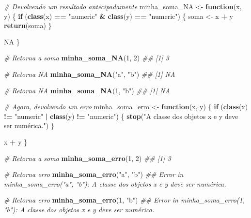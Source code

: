 \documentclass[]{book}
\newenvironment{Shaded}{\begin{snugshade}}{\end{snugshade}}
\newcommand{\CommentTok}[1]{\textcolor[rgb]{0.56,0.35,0.01}{\textit{#1}}}
\newcommand{\ControlFlowTok}[1]{\textcolor[rgb]{0.13,0.29,0.53}{\textbf{#1}}}
\newcommand{\DecValTok}[1]{\textcolor[rgb]{0.00,0.00,0.81}{#1}}
\newcommand{\KeywordTok}[1]{\textcolor[rgb]{0.13,0.29,0.53}{\textbf{#1}}}
\newcommand{\NormalTok}[1]{#1}
\newcommand{\OperatorTok}[1]{\textcolor[rgb]{0.81,0.36,0.00}{\textbf{#1}}}
\newcommand{\OtherTok}[1]{\textcolor[rgb]{0.56,0.35,0.01}{#1}}
\newcommand{\StringTok}[1]{\textcolor[rgb]{0.31,0.60,0.02}{#1}}
\begin{document}
\begin{Shaded}
\begin{Highlighting}[]
\CommentTok{# Devolvendo um resultado antecipadamente}
\NormalTok{minha_soma_NA <-}\StringTok{ }\ControlFlowTok{function}\NormalTok{(x, y) \{}
  \ControlFlowTok{if}\NormalTok{ (}\KeywordTok{class}\NormalTok{(x) }\OperatorTok{==}\StringTok{ "numeric"} \OperatorTok{&}\StringTok{ }\KeywordTok{class}\NormalTok{(y) }\OperatorTok{==}\StringTok{ "numeric"}\NormalTok{) \{}
\NormalTok{     soma <-}\StringTok{ }\NormalTok{x }\OperatorTok{+}\StringTok{ }\NormalTok{y}
     \KeywordTok{return}\NormalTok{(soma)}
\NormalTok{  \}}
  
  \OtherTok{NA}
\NormalTok{\}}

\CommentTok{# Retorna a soma}
\KeywordTok{minha_soma_NA}\NormalTok{(}\DecValTok{1}\NormalTok{, }\DecValTok{2}\NormalTok{)}
\CommentTok{## [1] 3}

\CommentTok{# Retorna NA}
\KeywordTok{minha_soma_NA}\NormalTok{(}\StringTok{"a"}\NormalTok{, }\StringTok{"b"}\NormalTok{)}
\CommentTok{## [1] NA}

\CommentTok{# Retorna NA}
\KeywordTok{minha_soma_NA}\NormalTok{(}\DecValTok{1}\NormalTok{, }\StringTok{"b"}\NormalTok{)}
\CommentTok{## [1] NA}

\CommentTok{# Agora, devolvendo um erro}
\NormalTok{minha_soma_erro <-}\StringTok{ }\ControlFlowTok{function}\NormalTok{(x, y) \{}
  \ControlFlowTok{if}\NormalTok{ (}\KeywordTok{class}\NormalTok{(x) }\OperatorTok{!=}\StringTok{ "numeric"} \OperatorTok{|}\StringTok{ }\KeywordTok{class}\NormalTok{(y) }\OperatorTok{!=}\StringTok{ "numeric"}\NormalTok{) \{}
    \KeywordTok{stop}\NormalTok{(}\StringTok{"A classe dos objetos x e y deve ser numérica."}\NormalTok{)}
\NormalTok{  \}}
  
\NormalTok{  x }\OperatorTok{+}\StringTok{ }\NormalTok{y}
\NormalTok{\}}

\CommentTok{# Retorna a soma}
\KeywordTok{minha_soma_erro}\NormalTok{(}\DecValTok{1}\NormalTok{, }\DecValTok{2}\NormalTok{)}
\CommentTok{## [1] 3}

\CommentTok{# Retorna erro}
\KeywordTok{minha_soma_erro}\NormalTok{(}\StringTok{"a"}\NormalTok{, }\StringTok{"b"}\NormalTok{)}
\CommentTok{## Error in minha_soma_erro("a", "b"): A classe dos objetos x e y deve ser numérica.}

\CommentTok{# Retorna erro}
\KeywordTok{minha_soma_erro}\NormalTok{(}\DecValTok{1}\NormalTok{, }\StringTok{"b"}\NormalTok{)}
\CommentTok{## Error in minha_soma_erro(1, "b"): A classe dos objetos x e y deve ser numérica.}
\end{Highlighting}
\end{Shaded}
\end{document}
